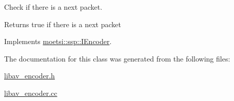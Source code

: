 Check if there is a next packet. 

\begin{DoxyReturn}{Returns}
true if there is a next packet 
\end{DoxyReturn}


Implements \hyperlink{classmoetsi_1_1ssp_1_1IEncoder_a2af8e23d841ef61f6ee4037e56a3694d}{moetsi\+::ssp\+::\+I\+Encoder}.



The documentation for this class was generated from the following files\+:\begin{DoxyCompactItemize}
\item 
\hyperlink{libav__encoder_8h}{libav\+\_\+encoder.\+h}\item 
\hyperlink{libav__encoder_8cc}{libav\+\_\+encoder.\+cc}\end{DoxyCompactItemize}

